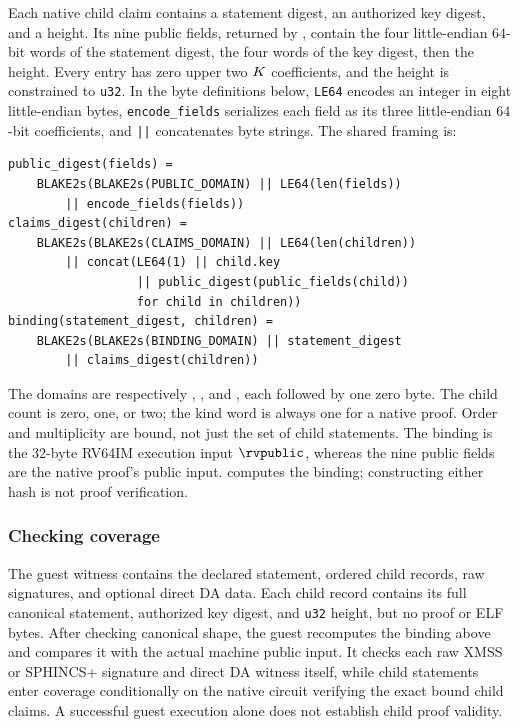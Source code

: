 Each native child claim contains a statement digest, an authorized key digest, and a height. Its nine public fields, returned by , contain the four little-endian $64$-bit words of the statement digest, the four words of the key digest, then the height. Every entry has zero upper two $K$ coefficients, and the height is constrained to \texttt{u32}. In the byte definitions below, \texttt{LE64} encodes an integer in eight little-endian bytes, \texttt{encode\_fields} serializes each field as its three little-endian $64$-bit coefficients, and \texttt{||} concatenates byte strings. The shared  framing is:
\begin{verbatim}
public_digest(fields) =
    BLAKE2s(BLAKE2s(PUBLIC_DOMAIN) || LE64(len(fields))
        || encode_fields(fields))
claims_digest(children) =
    BLAKE2s(BLAKE2s(CLAIMS_DOMAIN) || LE64(len(children))
        || concat(LE64(1) || child.key
                  || public_digest(public_fields(child))
                  for child in children))
binding(statement_digest, children) =
    BLAKE2s(BLAKE2s(BINDING_DOMAIN) || statement_digest
        || claims_digest(children))
\end{verbatim}
The domains are respectively , , and , each followed by one zero byte. The child count is zero, one, or two; the kind word is always one for a native proof. Order and multiplicity are bound, not just the set of child statements. The binding is the $32$-byte RV64IM execution input $\rvpublic$, whereas the nine public fields are the native proof's public input.  computes the binding; constructing either hash is not proof verification.

\subsubsection{Checking coverage}

The guest witness contains the declared statement, ordered child records, raw signatures, and optional direct DA data. Each child record contains its full canonical statement, authorized key digest, and \texttt{u32} height, but no proof or ELF bytes. After checking canonical shape, the guest recomputes the binding above and compares it with the actual machine public input. It checks each raw XMSS or SPHINCS+ signature and direct DA witness itself, while child statements enter coverage conditionally on the native circuit verifying the exact bound child claims. A successful guest execution alone does not establish child proof validity.

